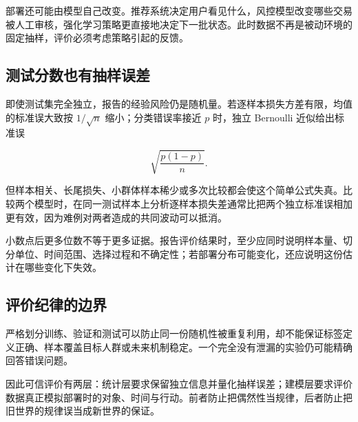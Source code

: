 部署还可能由模型自己改变。推荐系统决定用户看见什么，风控模型改变哪些交易被人工审核，强化学习策略更直接地决定下一批状态。此时数据不再是被动环境的固定抽样，评价必须考虑策略引起的反馈。

\subsection{测试分数也有抽样误差}

即使测试集完全独立，报告的经验风险仍是随机量。若逐样本损失方差有限，均值的标准误大致按 \(1/\sqrt n\) 缩小；分类错误率接近 \(p\) 时，独立 Bernoulli 近似给出标准误

\[
\sqrt{\frac{p(1-p)}{n}}.
\]

但样本相关、长尾损失、小群体样本稀少或多次比较都会使这个简单公式失真。比较两个模型时，在同一测试样本上分析逐样本损失差通常比把两个独立标准误相加更有效，因为难例对两者造成的共同波动可以抵消。

小数点后更多位数不等于更多证据。报告评价结果时，至少应同时说明样本量、切分单位、时间范围、选择过程和不确定性；若部署分布可能变化，还应说明这份估计在哪些变化下失效。

\subsection{评价纪律的边界}

严格划分训练、验证和测试可以防止同一份随机性被重复利用，却不能保证标签定义正确、样本覆盖目标人群或未来机制稳定。一个完全没有泄漏的实验仍可能精确回答错误问题。

因此可信评价有两层：统计层要求保留独立信息并量化抽样误差；建模层要求评价数据真正模拟部署时的对象、时间与行动。前者防止把偶然性当规律，后者防止把旧世界的规律误当成新世界的保证。
